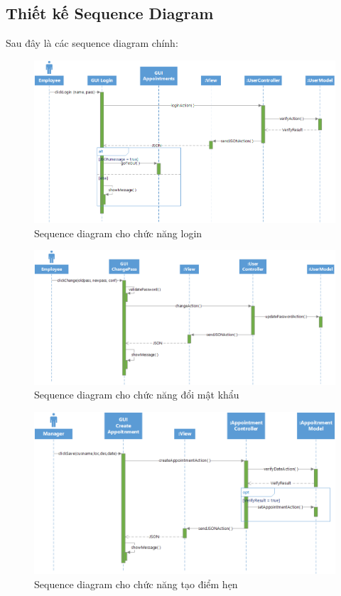 \documentclass[a4paper]{article}
\begin{document}
\subsection{Thiết kế Sequence Diagram}
Sau đây là các sequence diagram chính:
\begin{figure}[h]
    \includegraphics[width=13cm]{SequenceDiagram/Login}
    \centering
    \caption{Sequence diagram cho chức năng login}
    \label{fig:sequence_login}
\end{figure}
\begin{figure}[h]
    \includegraphics[width=13cm]{SequenceDiagram/ChangePassword}
    \centering
    \caption{Sequence diagram cho chức năng đổi mật khẩu}
    \label{fig:sequence_changepassword}
\end{figure}
\clearpage
\begin{figure}[!h]
    \includegraphics[width=13cm]{SequenceDiagram/CreateAppointment}
    \centering
    \caption{Sequence diagram cho chức năng tạo điểm hẹn}
    \label{fig:sequence_createappointment}
\end{figure}
\end{document}
